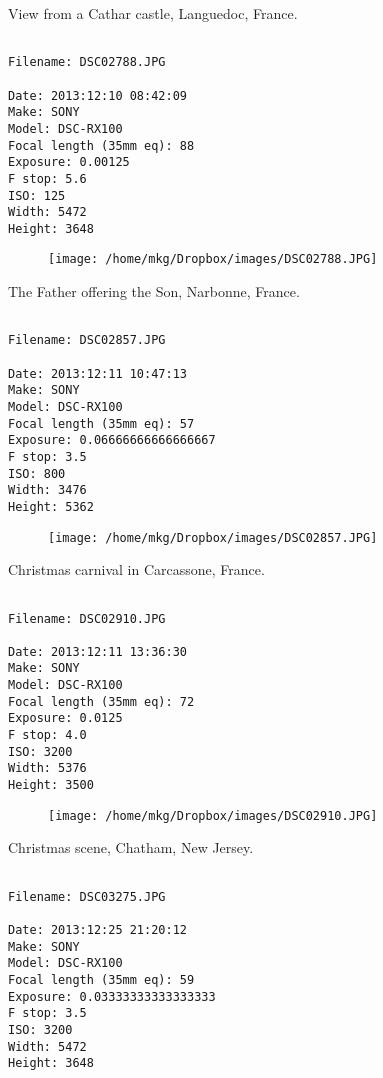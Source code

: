 \clearpage
\onecolumn
\noindent View from a Cathar castle, Languedoc, France.
\noindent
\begin{lstlisting}

Filename: DSC02788.JPG

Date: 2013:12:10 08:42:09
Make: SONY
Model: DSC-RX100
Focal length (35mm eq): 88
Exposure: 0.00125
F stop: 5.6
ISO: 125
Width: 5472
Height: 3648
\end{lstlisting}
\clearpage

\begin{figure}
\texttt{[image: /home/mkg/Dropbox/images/DSC02788.JPG]}
\end{figure}
    
\clearpage
\onecolumn
\noindent The Father offering the Son, Narbonne, France.
\noindent
\begin{lstlisting}

Filename: DSC02857.JPG

Date: 2013:12:11 10:47:13
Make: SONY
Model: DSC-RX100
Focal length (35mm eq): 57
Exposure: 0.06666666666666667
F stop: 3.5
ISO: 800
Width: 3476
Height: 5362
\end{lstlisting}
\clearpage

\begin{figure}
\texttt{[image: /home/mkg/Dropbox/images/DSC02857.JPG]}
\end{figure}
    
\clearpage
\onecolumn
\noindent Christmas carnival in Carcassone, France.
\noindent
\begin{lstlisting}

Filename: DSC02910.JPG

Date: 2013:12:11 13:36:30
Make: SONY
Model: DSC-RX100
Focal length (35mm eq): 72
Exposure: 0.0125
F stop: 4.0
ISO: 3200
Width: 5376
Height: 3500
\end{lstlisting}
\clearpage

\begin{figure}
\texttt{[image: /home/mkg/Dropbox/images/DSC02910.JPG]}
\end{figure}
    
\clearpage
\onecolumn
\noindent Christmas scene, Chatham, New Jersey.
\noindent
\begin{lstlisting}

Filename: DSC03275.JPG

Date: 2013:12:25 21:20:12
Make: SONY
Model: DSC-RX100
Focal length (35mm eq): 59
Exposure: 0.03333333333333333
F stop: 3.5
ISO: 3200
Width: 5472
Height: 3648
\end{lstlisting}
\clearpage

